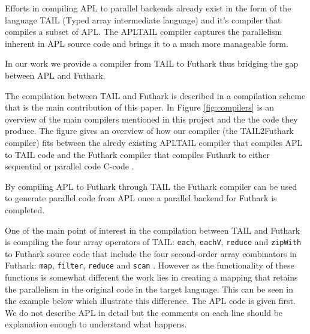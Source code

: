 \documentclass[11pt]{article}
\begin{document}
Efforts in compiling APL to parallel backends already exist in the form of the language 
TAIL (Typed array intermediate language) and it’s compiler \cite{ElsmanDybdal:Array:2014} that compiles a subset of APL.
The APLTAIL compiler captures the parallelism inherent in APL source code and brings it to a much more manageable form.

In our work we provide a compiler from TAIL 
to Futhark thus bridging the gap between APL and Futhark.

The compilation between TAIL and Futhark is described in a compilation scheme that is the main contribution of this paper. 
In Figure \ref{fig:compilers} is an overview of the main compilers mentioned in this project and the the code they produce.
The figure gives an overview of how our compiler (the TAIL2Futhark compiler) fits between the alredy existing APLTAIL compiler that compiles APL to TAIL code and the Futhark compiler that compiles Futhark to either sequential or parallel code C-code \cite{TroelsHenriksen}. 

By compiling APL to Futhark through TAIL the Futhark compiler can be used to generate parallel code from APL once a parallel backend for Futhark is completed.

One of the main point of interest in the compilation between TAIL and Futhark is compiling the four array operators 
of TAIL: {\tt each}, {\tt eachV}, 
 {\tt reduce} and {\tt zipWith} to Futhark source code that include the four second-order array combinators in Futhark:  
 {\tt map}, {\tt filter}, {\tt reduce} and {\tt scan} \cite{ElsmanDybdal:Array:2014}\cite{TroelsHenriksen}. 
However as the functionality of these functions is somewhat different the work lies in creating a mapping that retains the parallelism in the original code in the target language.
This can be seen in the example below which illustrate this difference. 
The APL code is given first. We do not describe APL in detail but the comments on each line should be explanation enough to understand what happens. 
\end{document}
